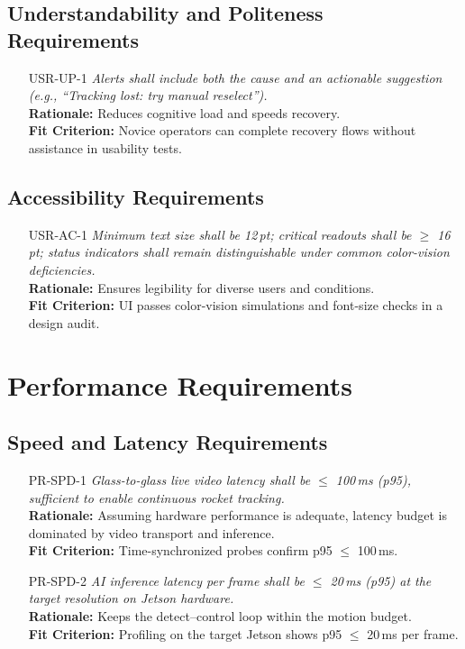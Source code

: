 \documentclass[12pt]{article}
\begin{document}
\subsection{Understandability and Politeness Requirements}
\begin{itemize}[leftmargin=*]
  \item[USR-UP-1] \emph{Alerts shall include both the cause and an actionable
          suggestion (e.g., ``Tracking lost: try manual reselect'').}\\
        \textbf{Rationale:} Reduces cognitive load and speeds recovery.\\ \textbf{Fit
          Criterion:} Novice operators can complete recovery flows without assistance in
        usability tests.
\end{itemize}

\subsection{Accessibility Requirements}
\begin{itemize}[leftmargin=*]
  \item[USR-AC-1] \emph{Minimum text size shall be 12\,pt; critical readouts shall be
          $\geq$ 16\,pt; status indicators shall remain distinguishable under common
          color-vision deficiencies.}\\ \textbf{Rationale:} Ensures legibility for
        diverse users and conditions.\\ \textbf{Fit Criterion:} UI passes color-vision
        simulations and font-size checks in a design audit.
\end{itemize}

\section{Performance Requirements}
\subsection{Speed and Latency Requirements}
\begin{itemize}[leftmargin=*]
  \item[PR-SPD-1] \emph{Glass-to-glass live video latency shall be $\leq$ 100\,ms
          (p95), sufficient to enable continuous rocket tracking.}\\ \textbf{Rationale:}
        Assuming hardware performance is adequate, latency budget is dominated by video
        transport and inference.\\ \textbf{Fit Criterion:} Time-synchronized probes
        confirm p95 $\leq$ 100\,ms.

  \item[PR-SPD-2] \emph{AI inference latency per frame shall be $\leq$ 20\,ms (p95) at
          the target resolution on Jetson hardware.}\\ \textbf{Rationale:} Keeps the
        detect–control loop within the motion budget.\\ \textbf{Fit Criterion:}
        Profiling on the target Jetson shows p95 $\leq$ 20\,ms per frame.
\end{itemize}
\end{document}
